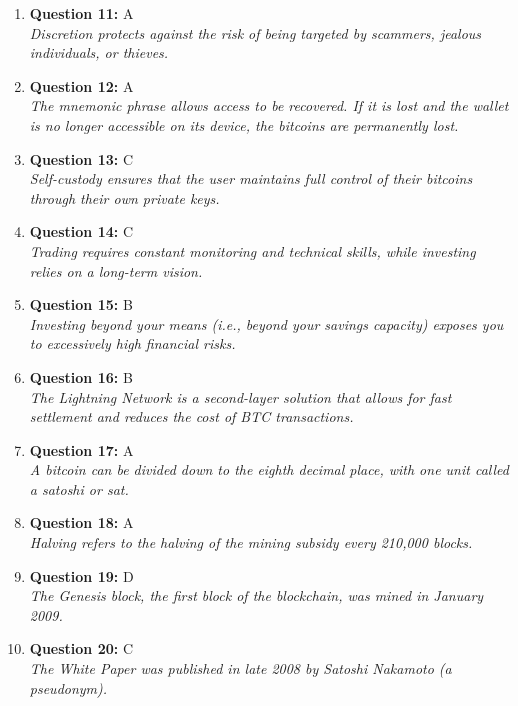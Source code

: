 \documentclass[12pt,a4paper]{article}
\begin{document}
\begin{enumerate}
\item \textbf{Question 11:} A
\\ \textit{Discretion protects against the risk of being targeted by scammers, jealous individuals, or thieves.}

\item \textbf{Question 12:} A
\\ \textit{The mnemonic phrase allows access to be recovered. If it is lost and the wallet is no longer accessible on its device, the bitcoins are permanently lost.}

\item \textbf{Question 13:} C
\\ \textit{Self-custody ensures that the user maintains full control of their bitcoins through their own private keys.}

\item \textbf{Question 14:} C
\\ \textit{Trading requires constant monitoring and technical skills, while investing relies on a long-term vision.}

\item \textbf{Question 15:} B
\\ \textit{Investing beyond your means (i.e., beyond your savings capacity) exposes you to excessively high financial risks.}

\item \textbf{Question 16:} B
\\ \textit{The Lightning Network is a second-layer solution that allows for fast settlement and reduces the cost of BTC transactions.}

\item \textbf{Question 17:} A
\\ \textit{A bitcoin can be divided down to the eighth decimal place, with one unit called a satoshi or sat.}

\item \textbf{Question 18:} A
\\ \textit{Halving refers to the halving of the mining subsidy every 210,000 blocks.}

\item \textbf{Question 19:} D
\\ \textit{The Genesis block, the first block of the blockchain, was mined in January 2009.}

\item \textbf{Question 20:} C
\\ \textit{The White Paper was published in late 2008 by Satoshi Nakamoto (a pseudonym).}


\end{enumerate}
\end{document}
